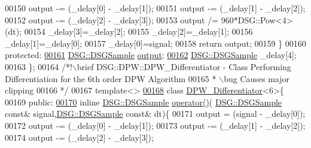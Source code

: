 \begin{DoxyCode}
00150                 output -= (\_delay[0] - \_delay[1]);
00151                 output -= (\_delay[1] - \_delay[2]);
00152                 output -= (\_delay[2] - \_delay[3]);
00153                 output /= 960*DSG::Pow<4>(dt);
00154                 \_delay[3]=\_delay[2];
00155                 \_delay[2]=\_delay[1];
00156                 \_delay[1]=\_delay[0];
00157                 \_delay[0]=signal;
00158                 \textcolor{keywordflow}{return} output;
00159             \}
00160         \textcolor{keyword}{protected}:
\hypertarget{_d_p_w_8h_source_l00161}{}\hyperlink{class_d_s_g_1_1_d_p_w_1_1_d_p_w___differentiator_3_015_01_4_ae69bdfd7eb71c3c44691bda6067bda0c}{00161}             \hyperlink{namespace_d_s_g_ac39a94cd27ebcd9c1e7502d0c624894a}{DSG::DSGSample} \hyperlink{class_d_s_g_1_1_d_p_w_1_1_d_p_w___differentiator_3_015_01_4_ae69bdfd7eb71c3c44691bda6067bda0c}{output};
\hypertarget{_d_p_w_8h_source_l00162}{}\hyperlink{class_d_s_g_1_1_d_p_w_1_1_d_p_w___differentiator_3_015_01_4_afc272a1eb4f3240b4148a64c7c9ccfc1}{00162}             \hyperlink{namespace_d_s_g_ac39a94cd27ebcd9c1e7502d0c624894a}{DSG::DSGSample} \_delay[4];
00163         \};\textcolor{comment}{}
00164 \textcolor{comment}{        /*!\(\backslash\)brief DSG::DPW::DPW\_Differentiator - Class Performing Differentiation for the 6th order DPW
       Algorithm}
00165 \textcolor{comment}{         * \(\backslash\)bug Causes major clipping}
00166 \textcolor{comment}{         */}
00167         \textcolor{keyword}{template}<>
\hypertarget{_d_p_w_8h_source_l00168}{}\hyperlink{class_d_s_g_1_1_d_p_w_1_1_d_p_w___differentiator_3_016_01_4}{00168}         \textcolor{keyword}{class }\hyperlink{class_d_s_g_1_1_d_p_w_1_1_d_p_w___differentiator}{DPW\_Differentiator}<6>\{
00169         \textcolor{keyword}{public}:
\hypertarget{_d_p_w_8h_source_l00170}{}\hyperlink{class_d_s_g_1_1_d_p_w_1_1_d_p_w___differentiator_3_016_01_4_a82356846abaeef0ed76e9803a7863f3c}{00170}             \textcolor{keyword}{inline} \hyperlink{namespace_d_s_g_ac39a94cd27ebcd9c1e7502d0c624894a}{DSG::DSGSample} \hyperlink{class_d_s_g_1_1_d_p_w_1_1_d_p_w___differentiator_3_016_01_4_a82356846abaeef0ed76e9803a7863f3c}{operator()}(
      \hyperlink{namespace_d_s_g_ac39a94cd27ebcd9c1e7502d0c624894a}{DSG::DSGSample} \textcolor{keyword}{const}& signal,\hyperlink{namespace_d_s_g_ac39a94cd27ebcd9c1e7502d0c624894a}{DSG::DSGSample} \textcolor{keyword}{const}& dt)\{
00171                 output  = (signal - \_delay[0]);
00172                 output -= (\_delay[0] - \_delay[1]);
00173                 output -= (\_delay[1] - \_delay[2]);
00174                 output -= (\_delay[2] - \_delay[3]);

\end{DoxyCode}
